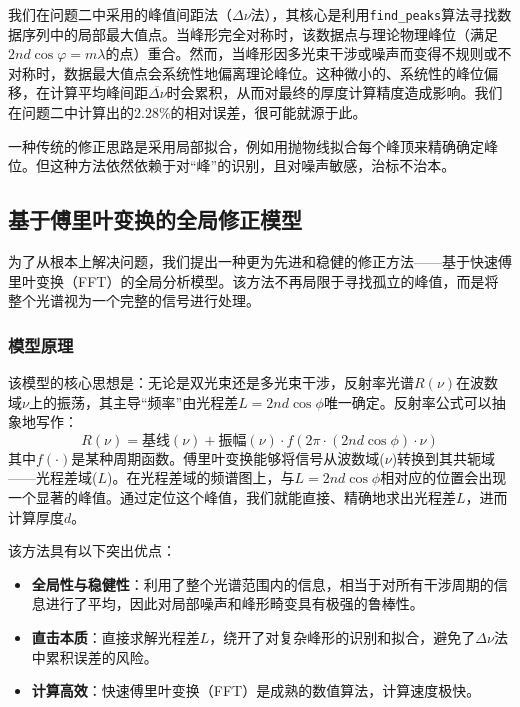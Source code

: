 \documentclass{ctexart} %
\begin{document}
我们在问题二中采用的峰值间距法（$\Delta\nu$法），其核心是利用\texttt{find\_peaks}算法寻找数据序列中的局部最大值点。当峰形完全对称时，该数据点与理论物理峰位（满足$2nd\cos\varphi=m\lambda$的点）重合。然而，当峰形因多光束干涉或噪声而变得不规则或不对称时，数据最大值点会系统性地偏离理论峰位。这种微小的、系统性的峰位偏移，在计算平均峰间距$\overline{\Delta\nu}$时会累积，从而对最终的厚度计算精度造成影响。我们在问题二中计算出的$2.28\%$的相对误差，很可能就源于此。

一种传统的修正思路是采用局部拟合，例如用抛物线拟合每个峰顶来精确确定峰位。但这种方法依然依赖于对“峰”的识别，且对噪声敏感，治标不治本。

\subsection{基于傅里叶变换的全局修正模型}

为了从根本上解决问题，我们提出一种更为先进和稳健的修正方法——基于快速傅里叶变换（FFT）的全局分析模型。该方法不再局限于寻找孤立的峰值，而是将整个光谱视为一个完整的信号进行处理。

\subsubsection{模型原理}
该模型的核心思想是：无论是双光束还是多光束干涉，反射率光谱$R(\nu)$在波数域$\nu$上的振荡，其主导“频率”由光程差$L = 2nd\cos\phi$唯一确定。反射率公式可以抽象地写作：
$$
    R(\nu) = \text{基线}(\nu) + \text{振幅}(\nu) \cdot f(2\pi \cdot (2nd\cos\phi) \cdot \nu)
$$
其中$f(\cdot)$是某种周期函数。傅里叶变换能够将信号从波数域($\nu$)转换到其共轭域——光程差域($L$)。在光程差域的频谱图上，与$L=2nd\cos\phi$相对应的位置会出现一个显著的峰值。通过定位这个峰值，我们就能直接、精确地求出光程差$L$，进而计算厚度$d$。

该方法具有以下突出优点：
\begin{itemize}
    \item \textbf{全局性与稳健性}：利用了整个光谱范围内的信息，相当于对所有干涉周期的信息进行了平均，因此对局部噪声和峰形畸变具有极强的鲁棒性。
    \item \textbf{直击本质}：直接求解光程差$L$，绕开了对复杂峰形的识别和拟合，避免了$\Delta\nu$法中累积误差的风险。
    \item \textbf{计算高效}：快速傅里叶变换（FFT）是成熟的数值算法，计算速度极快。
\end{itemize}
\end{document}
